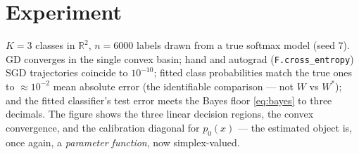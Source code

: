 \documentclass[11pt]{article}
\begin{document}
\section{Experiment}

$K = 3$ classes in $\mathbb{R}^2$, $n = 6000$ labels drawn from a true
softmax model (seed 7). GD converges in the single convex basin; hand and
autograd (\texttt{F.cross\_entropy}) SGD trajectories coincide to
$10^{-10}$; fitted class probabilities match the true ones to
$\approx 10^{-2}$ mean absolute error (the identifiable comparison ---
not $W$ vs $W^\ast$); and the fitted classifier's test error meets the
Bayes floor \eqref{eq:bayes} to three decimals. The figure shows the
three linear decision regions, the convex convergence, and the
calibration diagonal for $p_0(x)$ --- the estimated object is, once
again, a \emph{parameter function}, now simplex-valued.
\end{document}
